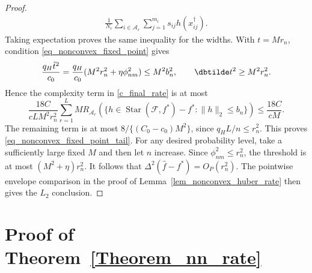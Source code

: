 \documentclass[twoside,11pt]{article}
\newenvironment{revision}{\color{revisionred}}{}
\begin{document}
\begin{revision}
\begin{proof}
\begin{align*}
\frac1{N_r}\sum_{i\in\mathcal A_r}\sum_{j=1}^{m_i}s_{ij}h(x_{ij}^\dagger).
\end{align*}
Taking expectation proves the same inequality for the widths.
With $t=Mr_n$, condition \eqref{eq_nonconvex_fixed_point} gives
\[
\frac{q_H\tilde t^2}{c_0}
=\frac{q_H}{c_0}(M^2r_n^2+\eta\phi_{nm}^2)
\leq M^2b_n^2,\qquad
\dbtilde t^2\geq M^2r_n^2.
\]
Hence the complexity term in \eqref{c_final_rate} is at most
\[
\frac{18C}{cL M^2r_n^2}
\sum_{r=1}^L M
R_{\mathcal A_r}\left(
\{h\in\operatorname{Star}(\mathcal F,f^*)-f^*:
                                      \|h\|_2\leq b_n\}\right)
\leq\frac{18C}{cM}.
\]
The remaining term is at most
$8/\{(C_0-c_0)M^2\}$, since $q_H L/n\leq r_n^2$.
This proves \eqref{eq_nonconvex_fixed_point_tail}.
For any desired probability level, take a sufficiently large fixed
$M$ and then let $n$ increase. Since $\phi_{nm}^2\leq r_n^2$,
the threshold is at most $(M^2+\eta)r_n^2$.
It follows that $\Delta^2(\hat f-f^*)=O_P(r_n^2)$.
The pointwise envelope comparison in the proof of
Lemma~\ref{lem_nonconvex_huber_rate} then gives the $L_2$ conclusion.
\end{proof}
\end{revision}


\section{Proof of Theorem~\ref{Theorem_nn_rate}}
\end{document}
